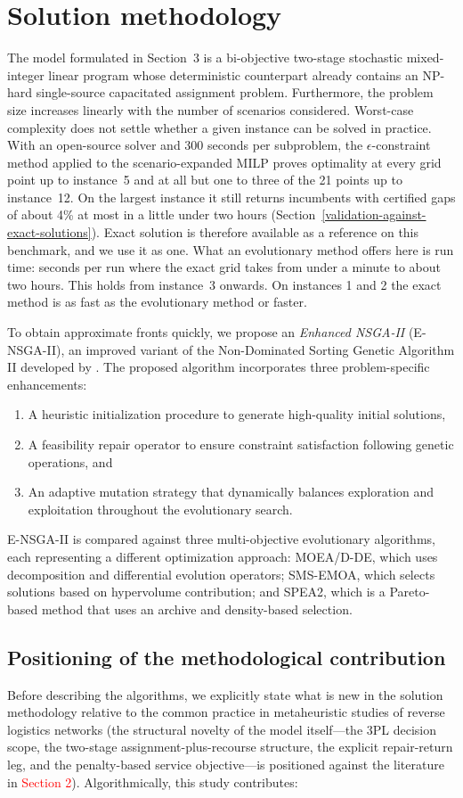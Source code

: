 \documentclass[11pt, a4paper]{article}
\begin{document}
\section{Solution methodology}
The model formulated in Section~3 is a bi-objective two-stage stochastic mixed-integer linear program whose deterministic counterpart already contains an NP-hard single-source capacitated assignment problem. Furthermore, the problem size increases linearly with the number of scenarios considered. Worst-case complexity does not settle whether a given instance can be solved in practice. With an open-source solver and 300 seconds per subproblem, the $\epsilon$-constraint method applied to the scenario-expanded MILP proves optimality at every grid point up to instance~5 and at all but one to three of the 21 points up to instance~12. On the largest instance it still returns incumbents with certified gaps of about 4\% at most in a little under two hours (Section~\ref{validation-against-exact-solutions}). Exact solution is therefore available as a reference on this benchmark, and we use it as one. What an evolutionary method offers here is run time: seconds per run where the exact grid takes from under a minute to about two hours. This holds from instance~3 onwards. On instances 1 and 2 the exact method is as fast as the evolutionary method or faster.

To obtain approximate fronts quickly, we propose an \emph{Enhanced NSGA-II} (E-NSGA-II), an improved variant of the Non-Dominated Sorting Genetic Algorithm II developed by \citet{Kdeb2002}. The proposed algorithm incorporates three problem-specific enhancements:
\begin{enumerate}
    \item A heuristic initialization procedure to generate high-quality initial solutions,
    \item A feasibility repair operator to ensure constraint satisfaction following genetic operations, and 
    \item An adaptive mutation strategy that dynamically balances exploration and exploitation throughout the evolutionary search.
\end{enumerate}
E-NSGA-II is compared against three multi-objective evolutionary algorithms, each representing a different optimization approach: MOEA/D-DE, which uses decomposition and differential evolution operators; SMS-EMOA, which selects solutions based on hypervolume contribution; and SPEA2, which is a Pareto-based method that uses an archive and density-based selection.
\iffalse
\subsection{Positioning of the methodological
contribution}\label{positioning-of-the-methodological-contribution}
Before describing the algorithms, we explicitly state what is new in the solution methodology relative to the common practice in metaheuristic studies of reverse logistics networks (the structural novelty of the model itself—the 3PL decision scope, the two-stage assignment-plus-recourse structure, the explicit repair-return leg, and the penalty-based service objective—is positioned against the literature in \textcolor{red}{Section 2}). Algorithmically, this study contributes:
\end{document}
